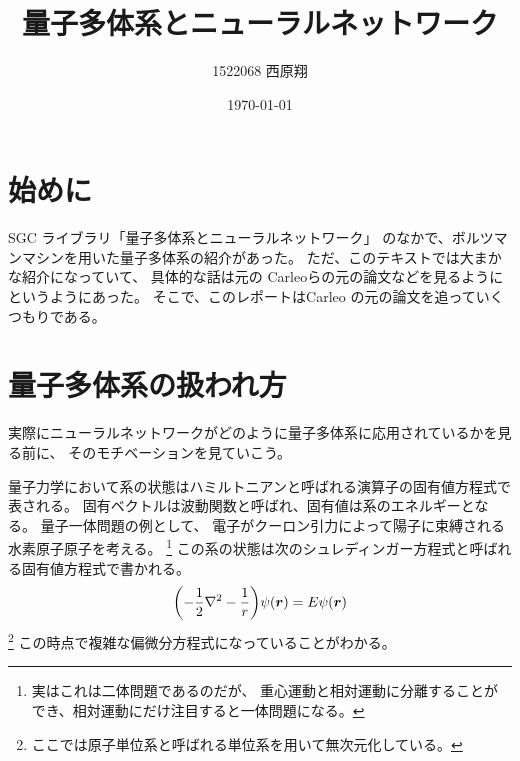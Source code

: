 \documentclass[twocolumn,10pt,dvipdfmx,a4paper]{jsarticle}
\title{量子多体系とニューラルネットワーク}
\author{1522068 西原翔}
\date{\today}
\begin{document}
\section{始めに}
SGC ライブラリ「量子多体系とニューラルネットワーク」\cite{SGC191}
のなかで、ボルツマンマシンを用いた量子多体系の紹介があった。
ただ、このテキストでは大まかな紹介になっていて、
具体的な話は元の Carleoらの元の論文など\cite{Carleo-2017}\cite{Carleo-2018}を見るようにというようにあった。
そこで、このレポートはCarleo の元の論文\cite{Carleo-2017}を追っていくつもりである。

\section{量子多体系の扱われ方}
実際にニューラルネットワークがどのように量子多体系に応用されているかを見る前に、
そのモチベーションを見ていこう。

量子力学において系の状態はハミルトニアンと呼ばれる演算子の固有値方程式で表される。
固有ベクトルは波動関数と呼ばれ、固有値は系のエネルギーとなる。
量子一体問題の例として、
電子がクーロン引力によって陽子に束縛される水素原子原子を考える。
\footnote{実はこれは二体問題であるのだが、
重心運動と相対運動に分離することができ、相対運動にだけ注目すると一体問題になる。}
この系の状態は次のシュレディンガー方程式と呼ばれる固有値方程式で書かれる。
\begin{equation}
    \qty(-\frac{1}{2}\laplacian -\frac{1}{r})\psi(\vb*{r})=E\psi(\vb*{r})
\end{equation}
\footnote{ここでは原子単位系と呼ばれる単位系を用いて無次元化している。}
この時点で複雑な偏微分方程式になっていることがわかる。
\end{document}
